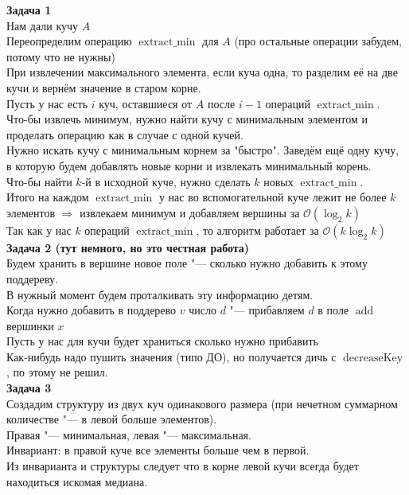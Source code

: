 \documentclass[14pt,a4paper,report]{ncc}
\begin{document}
\textbf{Задача 1}\\
Нам дали кучу $A$\\
Переопределим операцию $\operatorname{extract\_min}$ для $A$ (про остальные операции забудем, потому что не нужны)\\
При извлечении максимального элемента, если куча одна, то разделим её на две кучи и вернём значение в старом корне.\\
Пусть у нас есть $i$ куч, оставшиеся от $A$ после $i-1$ операций $\operatorname{extract\_min}$.\\
Что-бы извлечь минимум, нужно найти кучу с минимальным элементом и проделать операцию как в случае с одной кучей.\\
Нужно искать кучу с минимальным корнем за "быстро". Заведём ещё одну кучу, в которую будем добавлять новые корни и извлекать минимальный корень.\\
Что-бы найти $k$-й в исходной куче, нужно сделать $k$ новых $\operatorname{extract\_min}$.\\
Итого на каждом $\operatorname{extract\_min}$ у нас во вспомогательной куче лежит не более $k$ элементов $\Rightarrow$ извлекаем минимум и добавляем вершины за $\mathcal{O}(\log_2{k})$\\
Так как у нас $k$ операций $\operatorname{extract\_min}$, то алгоритм работает за $\mathcal{O}(k\log_2{k})$\\

\textbf{Задача 2 (тут немного, но это честная работа)}\\
Будем хранить в вершине новое поле "--- сколько нужно добавить к этому поддереву.\\
В нужный момент будем проталкивать эту информацию детям.\\
Когда нужно добавить в поддерево $v$ число $d$ "--- прибавляем $d$ в поле $\operatorname{add}$ вершинки $x$\\
Пусть у нас для кучи будет храниться сколько нужно прибавить\\
Как-нибудь надо пушить значения (типо ДО), но получается дичь с $\operatorname{decreaseKey}$, по этому не решил.\\

\textbf{Задача 3}\\
Создадим структуру из двух куч одинакового размера (при нечетном суммарном количестве "--- в левой больше элементов).\\ Правая "--- минимальная, левая "--- максимальная.\\
Инвариант: в правой куче все элементы больше чем в первой.\\
Из инварианта и структуры следует что в корне левой кучи всегда будет находиться искомая медиана.\\
\end{document}
